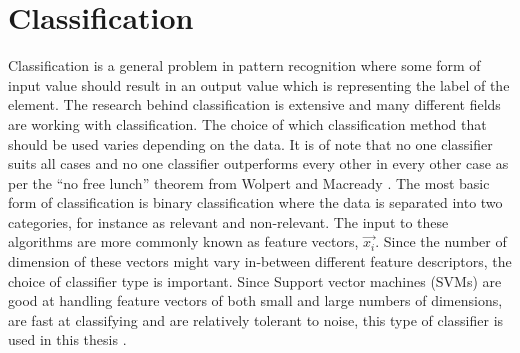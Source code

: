 \section{Classification}

Classification is a general problem in pattern recognition where some form of input value should result in an output value which is representing the label of the element. The research behind classification is extensive and many different fields are working with classification. The choice of which classification method that should be used varies depending on the data. It is of note that no one classifier suits all cases and no one classifier outperforms every other in every other case as per the ``no free lunch'' theorem from Wolpert and Macready \cite{nflTheorem}. The most basic form of classification is binary classification where the data is separated into two categories, for instance as relevant and non-relevant. The input to these algorithms are more commonly known as feature vectors, $\vec{x_i}$. Since the number of dimension of these vectors might vary in-between different feature descriptors, the choice of classifier type is important. Since Support vector machines (SVMs) are good at handling feature vectors of both small and large numbers of dimensions, are fast at classifying and are relatively tolerant to noise, this type of classifier is used in this thesis \cite{kotsiantis2007supervised}\cite{kadam2016study}. 

